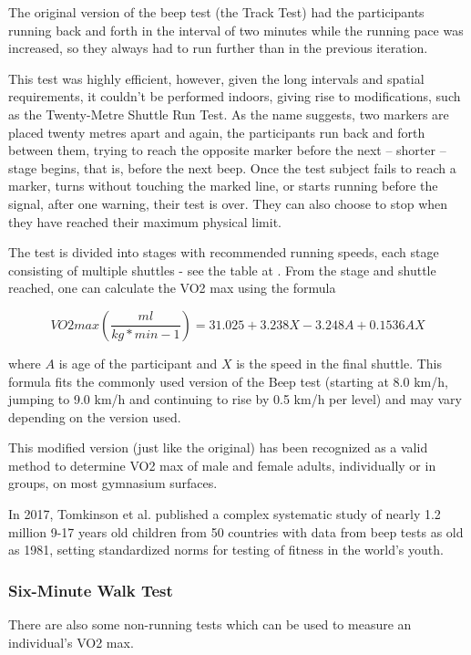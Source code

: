 The original version of the beep test (the Track Test) had the participants running back and forth in the interval of two minutes while the running pace was increased, so they always had to run further than in the previous iteration.

This test was highly efficient, however, given the long intervals and spatial requirements, it couldn't be performed indoors, giving rise to modifications, such as the Twenty-Metre Shuttle Run Test.
As the name suggests, two markers are placed twenty metres apart and again, the participants run back and forth between them, trying to reach the opposite marker before the next -- shorter -- stage begins, that is, before the next beep.
Once the test subject fails to reach a marker, turns without touching the marked line, or starts running before the signal, after one warning, their test is over.
They can also choose to stop when they have reached their maximum physical limit.

The test is divided into stages with recommended running speeds, each stage consisting of multiple shuttles - see the table at \cite{beep-test-scoring-table}.
From the stage and shuttle reached, one can calculate the VO2 max using the formula

\[VO2max (\frac{ml}{kg*min-1}) = 31.025 + 3.238X - 3.248A + 0.1536AX\]

where $A$ is age of the participant and $X$ is the speed in the final shuttle.
This formula fits the commonly used version of the Beep test (starting at 8.0 km/h, jumping to 9.0 km/h and continuing to rise by 0.5 km/h per level) and may vary depending on the version used.\cite{beep-test-versions}\cite{beep-test-20m-valid}

This modified version (just like the original) has been recognized as a valid method to determine VO2 max of male and female adults, individually or in groups, on most gymnasium surfaces.\cite{beep-test-20m-valid}

In 2017, Tomkinson et al. published a complex systematic study of nearly 1.2 million 9-17 years old children from 50 countries with data from beep tests as old as 1981,
setting standardized norms for testing of fitness in the world's youth.\cite{beep-test-youth-large-study}


\subsubsection*{Six-Minute Walk Test}

There are also some non-running tests which can be used to measure an individual's VO2 max.

